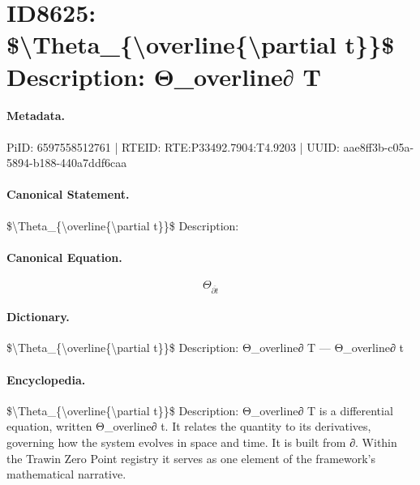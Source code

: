 \section*{ID8625: \$\textbackslash{}Theta\_\{\textbackslash{}overline\{\textbackslash{}partial t\}\}\$ Description: Θ\_overline∂ T}
\paragraph{Metadata.}
PiID: 6597558512761 | RTEID: RTE:P33492.7904:T4.9203 | UUID: aae8ff3b-c05a-5894-b188-440a7ddf6caa

\paragraph{Canonical Statement.}
\$\textbackslash{}Theta\_\{\textbackslash{}overline\{\textbackslash{}partial t\}\}\$ Description:

\paragraph{Canonical Equation.}
\[
\Theta_{\overline{\partial t}}
\]

\paragraph{Dictionary.}
\$\textbackslash{}Theta\_\{\textbackslash{}overline\{\textbackslash{}partial t\}\}\$ Description: Θ\_overline∂ T — Θ\_overline∂ t

\paragraph{Encyclopedia.}
\$\textbackslash{}Theta\_\{\textbackslash{}overline\{\textbackslash{}partial t\}\}\$ Description: Θ\_overline∂ T is a differential equation, written Θ\_overline∂ t. It relates the quantity to its derivatives, governing how the system evolves in space and time. It is built from ∂. Within the Trawin Zero Point registry it serves as one element of the framework's mathematical narrative.
